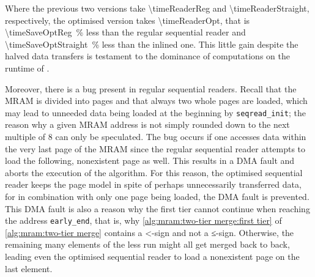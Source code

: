 Where the previous two versions take \qty[exponent-mode=fixed, fixed-exponent=9, round-mode=places, round-precision=2]{\timeReaderReg}{\cycle} and \qty[exponent-mode=fixed, fixed-exponent=9, round-mode=places, round-precision=2]{\timeReaderStraight}{\cycle}, respectively, the optimised version takes \qty[exponent-mode=fixed, fixed-exponent=9, round-mode=places, round-precision=2]{\timeReaderOpt}{\cycle}, that is \qty[round-mode=places, round-precision=0]{\timeSaveOptReg}{\percent} less than the regular sequential reader and \qty[round-mode=places, round-precision=0]{\timeSaveOptStraight}{\percent} less than the inlined one.
This little gain despite the halved data transfers is testament to the dominance of computations on the runtime of \MS{}.

Moreover, there is a bug present in regular sequential readers.
Recall that the \ac{MRAM} is divided into pages and that always two whole pages are loaded, which may lead to unneeded data being loaded at the beginning by \lstinline|seqread_init|;
the reason why a given \ac{MRAM} address is not simply rounded down to the next multiple of 8 can only be speculated.
The bug occurs if one accesses data within the very last page of the \ac{MRAM} since the regular sequential reader attempts to load the following, nonexistent page as well.
This results in a \ac{DMA} fault and aborts the execution of the algorithm.
For this reason, the optimised sequential reader keeps the page model in spite of perhaps unnecessarily transferred data, for in combination with only one page being loaded, the \ac{DMA} fault is prevented.
This \ac{DMA} fault is also a reason why the first tier cannot continue when reaching the address \lstinline|early_end|, that is, why \cref{alg:mram:two-tier merge:first tier} of \cref{alg:mram:two-tier merge} contains a <-sign and not a ≤-sign.
Otherwise, the remaining \unrollfactor{} many elements of the less run might all get merged back to back, leading even the optimised sequential reader to load a nonexistent page on the last element.
